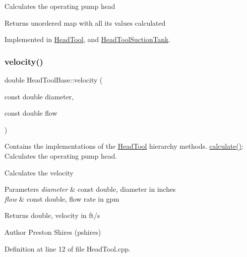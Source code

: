 Calculates the operating pump head

\begin{DoxyReturn}{Returns}
unordered map with all its values calculated 
\end{DoxyReturn}


Implemented in \hyperlink{class_head_tool_ab107e7717df4ca95404ce1952c21a84e}{Head\+Tool}, and \hyperlink{class_head_tool_suction_tank_a390a38466222aa3b87d2cf2ec84537a5}{Head\+Tool\+Suction\+Tank}.

\mbox{\label{class_head_tool_base_ab79bb695c514b740d9ea01df60b68a23}} 
\subsubsection{\texorpdfstring{velocity()}{velocity()}}
{\footnotesize\ttfamily double Head\+Tool\+Base\+::velocity (\begin{DoxyParamCaption}\item[{const double}]{diameter,  }\item[{const double}]{flow }\end{DoxyParamCaption})\hspace{0.3cm}{\ttfamily [protected]}}



Contains the implementations of the \hyperlink{class_head_tool}{Head\+Tool} hierarchy methods. \hyperlink{class_head_tool_base_ab8df8f908827ce45dc5e769ea0e10f0b}{calculate()}\+: Calculates the operating pump head. 

Calculates the velocity


\begin{DoxyParams}{Parameters}
{\em diameter} & const double, diameter in inches \\
\hline
{\em flow} & const double, flow rate in gpm\\
\hline
\end{DoxyParams}
\begin{DoxyReturn}{Returns}
double, velocity in ft/s
\end{DoxyReturn}
\begin{DoxyAuthor}{Author}
Preston Shires (pshires) 
\end{DoxyAuthor}


Definition at line 12 of file Head\+Tool.\+cpp.

\mbox{\label{class_head_tool_base_a1dbece05fc1a248fa2aa64b6f09602f6}} 
